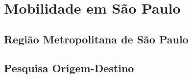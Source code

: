 \chapter{Mobilidade em São Paulo}
\label{cap:mobilidade-rmsp}

\section{Região Metropolitana de São Paulo}

\section{Pesquisa Origem-Destino}
